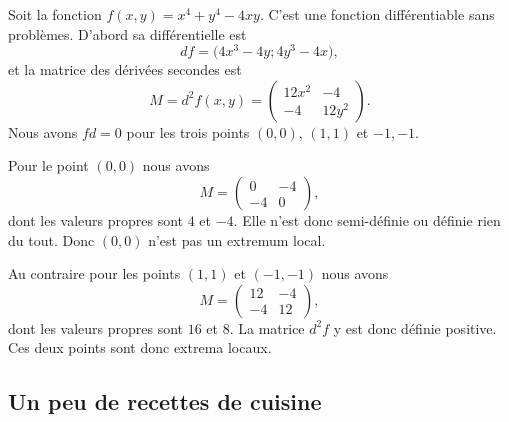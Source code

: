 \begin{example}
    Soit la fonction \( f(x,y)=x^4+y^4-4xy\). C'est une fonction différentiable sans problèmes. D'abord sa différentielle est
    \begin{equation}
        df=\big(4x^3-4y;4y^3-4x),
    \end{equation}
    et la matrice des dérivées secondes est
    \begin{equation}
        M=d^2f(x,y)=\begin{pmatrix}
            12x^2    &   -4    \\ 
            -4    &   12y^2    
        \end{pmatrix}.
    \end{equation}
    Nous avons \( fd=0\) pour les trois points \( (0,0)\), \( (1,1)\) et \( -1,-1\).

    Pour le point \( (0,0)\) nous avons
    \begin{equation}
        M=\begin{pmatrix}
            0    &   -4    \\ 
            -4    &   0    
        \end{pmatrix},
    \end{equation}
    dont les valeurs propres sont \( 4\) et \( -4\). Elle n'est donc semi-définie ou définie rien du tout. Donc \( (0,0)\) n'est pas un extremum local.

    Au contraire pour les points \( (1,1)\) et \( (-1,-1)\) nous avons
    \begin{equation}
        M=\begin{pmatrix}
            12    &   -4    \\ 
            -4    &   12    
        \end{pmatrix},
    \end{equation}
    dont les valeurs propres sont \( 16\) et \( 8\). La matrice \( d^2f\) y est donc définie positive. Ces deux points sont donc extrema locaux.
\end{example}

\subsection{Un peu de recettes de cuisine}

